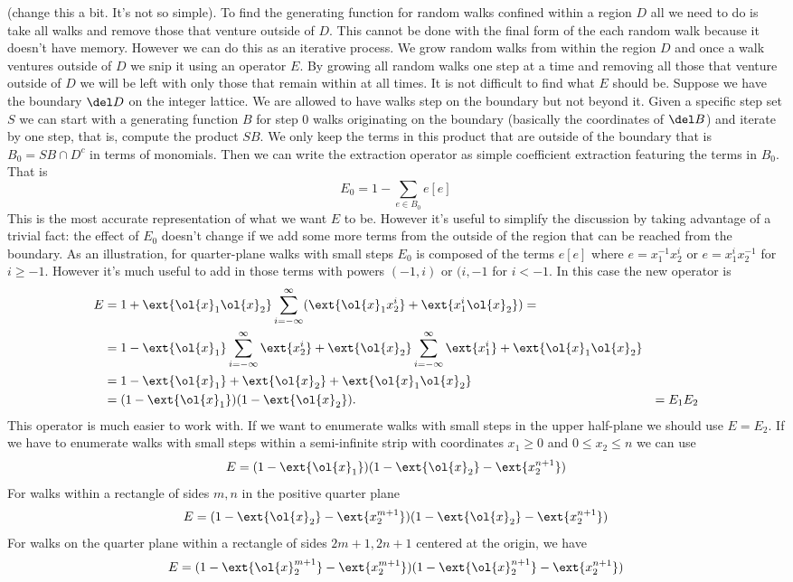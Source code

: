 (change this a bit. It's not so simple).
To find the generating function for random walks confined within a region $D$ all we need to do is take all walks and remove those that venture outside of $D$. This cannot be done with the final form of the each random walk because it doesn't have memory. However we can do this as an iterative process. We grow random walks from within the region $D$ and once a walk ventures outside of $D$ we snip it using an operator $E$. By growing all random walks one step at a time and removing all those that venture outside of $D$ we will be left with only those that remain within at all times. It is not difficult to find what $E$ should be. Suppose we have the boundary $\del D$ on the integer lattice. We are allowed to have walks step on the boundary but not beyond it. Given a specific step set $S$ we can start with a generating function $B$ for step 0 walks originating on the boundary (basically the coordinates of $\del B$) and iterate by one step, that is, compute the product $SB$. We only keep the terms in this product that are outside of the boundary that is $B_0 = SB \cap D^c$ in terms of monomials. Then we can write the extraction operator as simple coefficient extraction featuring the terms in $B_0$. That is
\[
	E_0 = 1 - \sum_{e \in B_0} e[e]
\]
This is the most accurate representation of what we want $E$ to be. However it's useful to simplify the discussion by taking advantage of a trivial fact: the effect of $E_0$ doesn't change if we add some more terms from the outside of the region that can be reached from the boundary. As an illustration, for quarter-plane walks with small steps $E_0$ is composed of the terms $e[e]$ where $e = x_1^{-1}x_2^{i}$ or $e = x_1^i x_2^{-1}$ for $i \ge -1$. However it's much useful to add in those terms with powers $(-1,i)$ or $(i,-1$ for $i < -1$. In this case the new operator is
\begin{align*}
	E &= 1+\ext{\ol{x}_1\ol{x}_2}\sum_{i=-\infty}^\infty(\ext{\ol{x}_1x_2^i}+ \ext{x_1^{i}\ol{x}_2}) = \\
	   &= 1 - \ext{\ol{x}_1}\sum_{i=-\infty}^\infty\ext{x_2^i}+ \ext{\ol{x}_2}\sum_{i=-\infty}^\infty\ext{x_1^{i}} + \ext{\ol{x}_1\ol{x}_2}\\
	   &=1 - \ext{\ol{x}_1}+ \ext{\ol{x}_2} + \ext{\ol{x}_1\ol{x}_2}\\
	   &=(1-\ext{\ol{x}_1})(1-\ext{\ol{x}_2}).
	   & = E_1E_2
\end{align*}
This operator is much easier to work with. If we want to enumerate walks with small steps in the upper half-plane we should use $E = E_2$. If we have to enumerate walks with small steps within a semi-infinite strip with coordinates $x_1 \ge 0$ and $0\leq x_2 \leq n$ we can use
\[
	E = (1-\ext{\ol{x}_1})(1-\ext{\ol{x}_2}-\ext{x_2^{n+1}})
\]
For walks within a rectangle of sides $m,n$ in the positive quarter plane
\[
	E = (1-\ext{\ol{x}_2}-\ext{x_2^{m+1}})(1-\ext{\ol{x}_2}-\ext{x_2^{n+1}})
\]
For walks on the quarter plane within a rectangle of sides $2m+1,2n+1$ centered at the origin, we have
\[
	E =(1-\ext{\ol{x}_2^{m+1}}-\ext{x_2^{m+1}})(1-\ext{\ol{x}_2^{n+1}}-\ext{x_2^{n+1}})
\]

